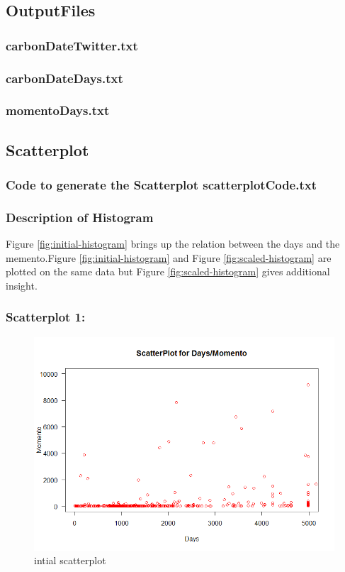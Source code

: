 \documentclass[12pt]{article}
\begin{document}
\subsection{OutputFiles}
\subsubsection{carbonDateTwitter.txt}

\subsubsection{carbonDateDays.txt}

\subsubsection{momentoDays.txt}

\newpage


\subsection{Scatterplot}
\subsubsection{Code to generate the Scatterplot scatterplotCode.txt}

\subsubsection{Description of Histogram}
Figure \ref{fig:initial-histogram} brings up the relation between the days and the memento.Figure \ref{fig:initial-histogram} and Figure \ref{fig:scaled-histogram} are plotted on the same data but Figure \ref{fig:scaled-histogram} gives additional insight. 
\subsubsection{Scatterplot 1:}
\begin{figure}[ht]
\includegraphics[scale=0.7]{../Q3/scatterDaysMomento_1}
\centering
\caption{intial scatterplot}
\label{intial-scatterplot}
\end{figure}
\newpage
\end{document}
